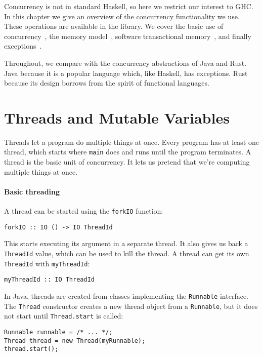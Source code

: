 Concurrency is not in standard Haskell, so here we restrict our
interest to GHC\@.  In this chapter we give an overview of the
concurrency functionality we use.  These operations are available in
the  library.  We cover the basic use of
concurrency~, the memory
model~, software transactional
memory~, and finally
exceptions~.

Throughout, we compare with the concurrency abstractions of Java and
Rust.  Java because it is a popular language which, like Haskell, has
exceptions.  Rust because its design borrows from the spirit of
functional languages.

\section{Threads and Mutable Variables}
\label{sec:concurrent_haskell-threads}

Threads let a program do multiple things at once.  Every program has
at least one thread, which starts where \verb|main| does and runs
until the program terminates.  A thread is the basic unit of
concurrency.  It lets us pretend that we're computing multiple things
at once.

\paragraph{Basic threading}
A thread can be started using the \verb|forkIO| function:

\begin{verbatim}
forkIO :: IO () -> IO ThreadId
\end{verbatim}

This starts executing its argument in a separate thread.  It also
gives us back a \verb|ThreadId| value, which can be used to kill the
thread.  A thread can get its own \verb|ThreadId| with
\verb|myThreadId|:

\begin{verbatim}
myThreadId :: IO ThreadId
\end{verbatim}

In Java, threads are created from classes implementing the
\verb|Runnable| interface.  The \verb|Thread| constructor creates a
new thread object from a \verb|Runnable|, but it does not start until
\verb|Thread.start| is called:

\begin{verbatim}
Runnable runnable = /* ... */;
Thread thread = new Thread(myRunnable);
thread.start();
\end{verbatim}


